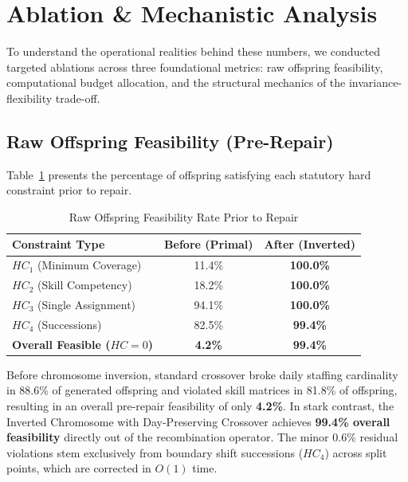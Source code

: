 \documentclass[10pt,journal,compsoc]{IEEEtran}
\begin{document}
\section{Ablation \& Mechanistic Analysis}
\label{sec:ablation}

To understand the operational realities behind these numbers, we conducted targeted ablations across three foundational metrics: raw offspring feasibility, computational budget allocation, and the structural mechanics of the invariance-flexibility trade-off.

\subsection{Raw Offspring Feasibility (Pre-Repair)}
Table~\ref{tab:feasibility_rate} presents the percentage of offspring satisfying each statutory hard constraint prior to repair.

\begin{table}[h]
\centering
\caption{Raw Offspring Feasibility Rate Prior to Repair}
\label{tab:feasibility_rate}
\footnotesize
\setlength{\tabcolsep}{4pt}
\begin{tabular}{lcc}
\toprule
\textbf{Constraint Type} & \textbf{Before (Primal)} & \textbf{After (Inverted)} \\
\midrule
$HC_1$ (Minimum Coverage)   & 11.4\% & \textbf{100.0\%} \\
$HC_2$ (Skill Competency)   & 18.2\% & \textbf{100.0\%} \\
$HC_3$ (Single Assignment)  & 94.1\% & \textbf{100.0\%} \\
$HC_4$ (Successions)        & 82.5\% & \textbf{99.4\%} \\
\midrule
\textbf{Overall Feasible ($HC = 0$)} & \textbf{4.2\%} & \textbf{99.4\%} \\
\bottomrule
\end{tabular}
\end{table}

Before chromosome inversion, standard crossover broke daily staffing cardinality in 88.6\% of generated offspring and violated skill matrices in 81.8\% of offspring, resulting in an overall pre-repair feasibility of only \textbf{4.2\%}. In stark contrast, the Inverted Chromosome with Day-Preserving Crossover achieves \textbf{99.4\% overall feasibility} directly out of the recombination operator. The minor 0.6\% residual violations stem exclusively from boundary shift successions ($HC_4$) across split points, which are corrected in $O(1)$ time.
\end{document}
